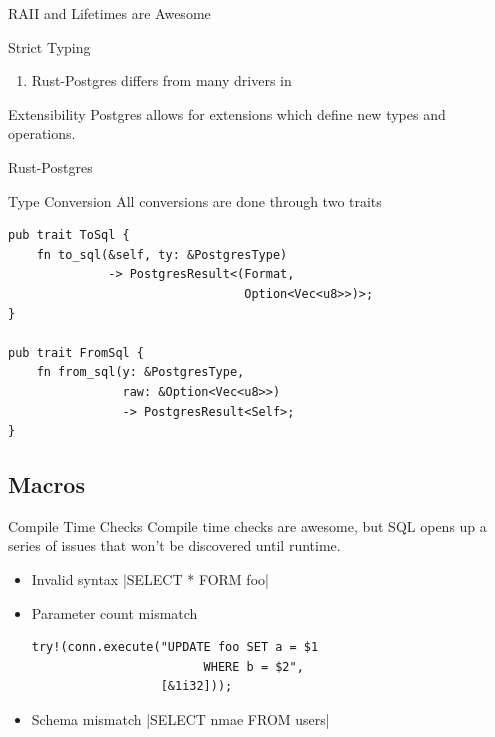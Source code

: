 \documentclass{beamer}
\begin{document}
\begin{frame}{RAII and Lifetimes are Awesome}
\end{frame}

\begin{frame}{Strict Typing}
    \begin{enumerate}
        \item Rust-Postgres differs from many drivers in 
    \end{enumerate}
\end{frame}

\begin{frame}{Extensibility}
    Postgres allows for extensions which define new types and operations.

    Rust-Postgres
\end{frame}

\begin{frame}[fragile]{Type Conversion}
    All conversions are done through two traits
    \begin{verbatim}
pub trait ToSql {
    fn to_sql(&self, ty: &PostgresType)
              -> PostgresResult<(Format,
                                 Option<Vec<u8>>)>;
} 

pub trait FromSql {
    fn from_sql(y: &PostgresType,
                raw: &Option<Vec<u8>>)
                -> PostgresResult<Self>;
}
    \end{verbatim}
\end{frame}

\subsection{Macros}

\begin{frame}[fragile]{Compile Time Checks}
    Compile time checks are awesome, but SQL opens up a series of issues that
    won't be discovered until runtime.
    \begin{itemize}
        \item Invalid syntax |SELECT * FORM foo|
        \item Parameter count mismatch
        \begin{verbatim}
try!(conn.execute("UPDATE foo SET a = $1
                        WHERE b = $2",
                  [&1i32]));
        \end{verbatim}
        \item Schema mismatch |SELECT nmae FROM users|
    \end{itemize}
\end{frame}
\end{document}
